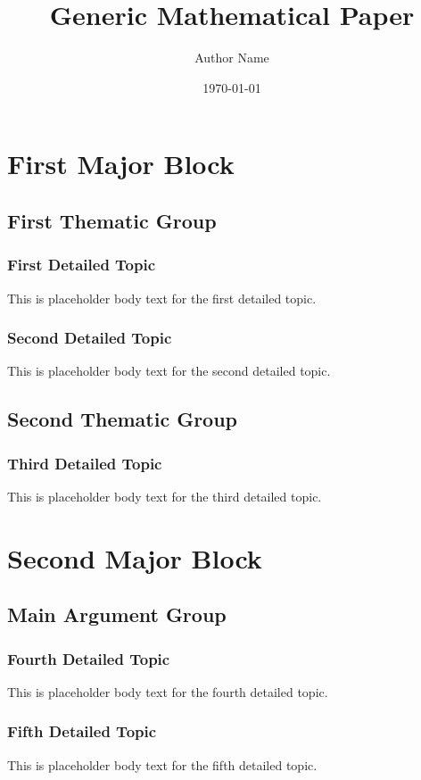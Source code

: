 \documentclass[12pt]{article}
\title{Generic Mathematical Paper}
\author{Author Name}
\date{\today}
\begin{document}
\maketitle
\tableofcontents
\clearpage


\section{First Major Block}
\subsection{First Thematic Group}
\subsubsection{First Detailed Topic}
This is placeholder body text for the first detailed topic.

\subsubsection{Second Detailed Topic}
This is placeholder body text for the second detailed topic.

\subsection{Second Thematic Group}
\subsubsection{Third Detailed Topic}
This is placeholder body text for the third detailed topic.

\section{Second Major Block}
\subsection{Main Argument Group}
\subsubsection{Fourth Detailed Topic}
This is placeholder body text for the fourth detailed topic.

\subsubsection{Fifth Detailed Topic}
This is placeholder body text for the fifth detailed topic.
\end{document}
